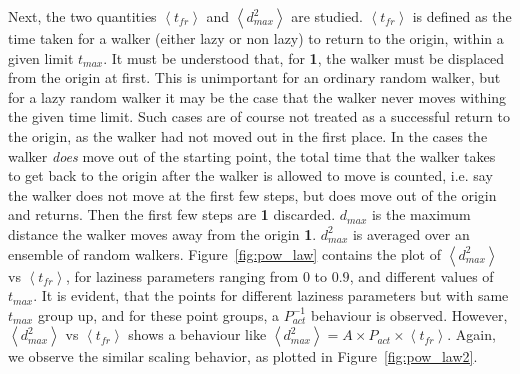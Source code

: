 \documentclass[12pt]{article}
\newcommand\lr{\left \langle}
\newcommand\rr{\right \rangle}
\newcommand\tbf[1]{\textbf{1}}
\begin{document}
\begin{enumerate}[I.]
\newline
Next, the two quantities $\lr t_{fr} \rr$ and $\lr d_{max}^2 \rr$ are studied. $\lr t_{fr} \rr$ is defined as the time taken for a walker (either lazy or non lazy) to return to the origin, within a given limit $t_{max}$. It must be understood that, for \tbf{returning}, the walker must be displaced from the origin at first. This is unimportant for an ordinary random walker, but for a lazy random walker it may be the case that the walker never moves withing the given time limit. Such cases are of course not treated as a successful return to the origin, as the walker had not moved out in the first place. In the cases the walker \emph{does} move out of the starting point, the total time that the walker takes to get back to the origin after the walker is allowed to move is counted, i.e. say the walker does not move at the first few steps, but does move out of the origin and returns. Then the first few steps are \tbf{not} discarded. $d_{max}$ is the maximum distance the walker moves away from the origin \tbf{before returning to the origin}. $d_{max}^2$ is averaged over an ensemble of random walkers. Figure~\ref{fig:pow_law} contains the plot of $\lr d_{max}^2 \rr$ vs $\lr t_{fr} \rr$, for laziness parameters ranging from $0$ to $0.9$, and different values of $t_{max}$. It is evident, that the points for different laziness parameters but with same $t_{max}$ group up, and for these point groups, a $P_{act}^{-1}$ behaviour is observed. However, $\lr d_{max}^{2} \rr$ vs $ \lr t_{fr} \rr$ shows a behaviour like $\lr d_{max}^{2} \rr = A\times P_{act} \times \lr t_{fr} \rr$. Again, we observe the similar scaling behavior, as plotted in Figure~\ref{fig:pow_law2}.

\end{enumerate}
\newpage
\end{document}
